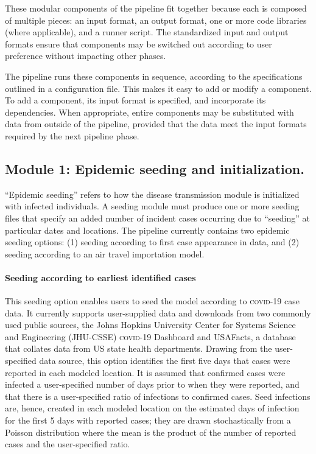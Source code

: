 These modular components of the pipeline fit together because each is composed of multiple pieces: an input format, an output format, one or more code libraries (where applicable), and a runner script. The standardized input and output formats ensure that components may be switched out according to user preference without impacting other phases. 

The pipeline runs these components in sequence, according to the specifications outlined in a configuration file. This makes it easy to add or modify a component. To add a component, its input format is specified, and incorporate its dependencies. When appropriate, entire components may be substituted with data from outside of the pipeline, provided that the data meet the input formats required by the next pipeline phase.

\subsection{Module 1: Epidemic seeding and initialization.} 

“Epidemic seeding” refers to how the disease transmission module is initialized with infected individuals. A seeding module must produce one or more seeding files that specify an added number of incident cases occurring due to “seeding” at particular dates and locations. The pipeline currently contains two epidemic seeding options: (1) seeding according to first case appearance in data, and (2) seeding according to an air travel importation model. 

\paragraph{Seeding according to earliest identified cases} This seeding option enables users to seed the model according to \textsc{covid}-19 case data. It currently supports user-supplied data and downloads from two commonly used public sources, the Johns Hopkins University Center for Systems Science and Engineering (JHU-CSSE) \textsc{covid}-19 Dashboard\cite{Dong:InteractiveWebbasedDashboard:2020} and USAFacts, a database that collates data from US state health departments\cite{USAFacts:USCOVID19Cases:2021}. Drawing from the user-specified data source, this option identifies the first five days that cases were reported in each modeled location. It is assumed that confirmed cases were infected a user-specified number of days prior to when they were reported, and that there is a user-specified ratio of infections to confirmed cases. Seed infections are, hence, created in each modeled location on the estimated days of infection for the first 5 days with reported cases; they are drawn stochastically from a Poisson distribution where the mean is the product of the number of reported cases and the user-specified ratio. 

